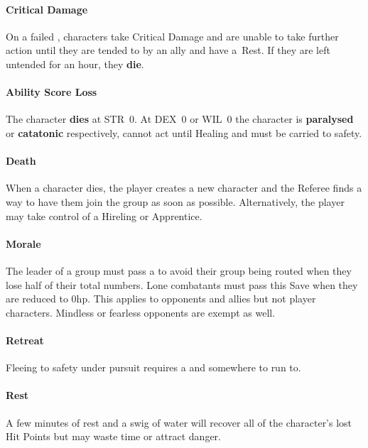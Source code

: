 \documentclass[itdr/core]{subfiles}
\begin{document}
\paragraph{Critical Damage}
On a failed , characters take Critical Damage and are unable to take further action until they are tended to by an ally and have a~Rest. If they are left untended for an hour, they \textbf{die}.\tight

\paragraph{Ability Score Loss}
The character \textbf{dies} at STR~0. At DEX~0 or WIL~0 the character is \textbf{paralysed} or \textbf{catatonic} respectively, cannot act until Healing and must be carried to safety.

\enlargethispage{\baselineskip}
\break

\paragraph{Death}
When a character dies, the player creates a new character and the Referee finds a way to have them join the group as soon as possible. Alternatively, the player may take control of a Hireling or Apprentice.

\vfill
\paragraph{Morale}
The leader of a group must pass a  to avoid their group being routed when they lose half of their total numbers. Lone combatants must pass this Save when they are reduced to 0hp. This applies to opponents and allies but not player characters. Mindless or fearless opponents are exempt as well.

\vfill
\paragraph{Retreat}
Fleeing to safety under pursuit requires a  and somewhere to run to.

\vfill
\paragraph{Rest}
A few minutes of rest and a swig of water will recover all of the character's lost Hit Points but may waste time or attract danger.\tight
\end{document}
